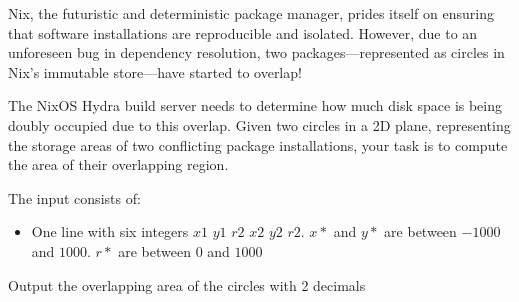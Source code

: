 \problemname{}


\newcommand{\maxa}{123456789}

Nix, the futuristic and deterministic package manager, prides itself on ensuring that software installations are reproducible and isolated. However, due to an unforeseen bug in dependency resolution, two packages—represented as circles in Nix’s immutable store—have started to overlap!

The NixOS Hydra build server needs to determine how much disk space is being doubly occupied due to this overlap. Given two circles in a 2D plane, representing the storage areas of two conflicting package installations, your task is to compute the area of their overlapping region.

\begin{Input}
    The input consists of:
    \begin{itemize}
        \item One line with six integers $x1$ $y1$ $r2$ $x2$ $y2$ $r2$. $x*$ and $y*$ are between $-1000$ and $1000$. $r*$ are between $0$ and $1000$
    \end{itemize}
\end{Input}

\begin{Output}
    Output the overlapping area of the circles with 2 decimals
\end{Output}

